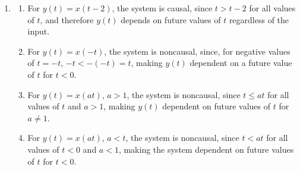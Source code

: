 \documentclass{article}
\begin{document}
\begin{enumerate}[label=\thesubsubsection]
\begin{enumerate}[label=\alph*)]
					Assuming that \(x_1(t) = \delta(t)\), then \[
					  y_1(t) = \int_{-5}^{5}\delta(\tau)d\tau = 1.
					\]
					Assuming that \(x_2(t) = \delta(t-10)\), then \[
					  y_2(t) = \int_{-5}^{5}\delta(\tau)d\tau = 0.
					\]
					Since the output of \(y_1(t) = 1\) is a constant (does not depend on t), in a time-invariant system, we would expect \(y_2(t) = y(t-10) = 1\). However, \(y_2(t) = 1 \neq 0 = x_2(t)\), and so the system is time variant.
				 \item 
					 Given \(x_1 = (\frac{dx(t)}{dt})^2\), \(x_2(t) = x_1(t-t_0) = (\frac{dx(t-t_0)}{dt})^2\). Then, shifting the output by the same amount, \(y_2(t) = y_1(t-t_0) = (\frac{dx(t-t_0)}{d(t-t_0)})^2\). Note that \(dt\) and \(d(t-t_0)\) have the same value, as they are infintesimal quantites, and thus we can say \(dt = d(t-t_0)\).
					 Therefore, \(y_2(t) = \frac{dx(t-t_0)}{dt} = x_2(t)\), proving the system is time invariant. 
		\end{enumerate}
		\setcounter{subsubsection}{15}
		\item
	  \begin{enumerate}[label=\alph*)]
			\item For \(y(t) = x(t-2)\), the system is causal, since \(t > t-2\) for all values of \(t\), and therefore \(y(t)\) depends on future values of \(t\) regardless of the input.
			\item For \(y(t) = x(-t)\), the system is noncausal, since, for negative values of \(t = -t\), \(-t < -(-t) = t\), making \(y(t)\) dependent on a future value of \(t\) for \(t < 0\). 
			\item For \(y(t) = x(at)\), \(a > 1\), the system is noncausal, since \(t \leq at\) for all values of \(t\) and \(a > 1\), making \(y(t)\) dependent on future values of \(t\) for \(a\neq1\).      
			\item For \(y(t) = x(at)\), \(a<t\), the system is noncausal, since \(t < at\) for all values of \(t < 0\) and \(a<1\), making the system dependent on future values of \(t\) for \(t < 0\).
		\end{enumerate}
\end{enumerate}
\end{document}
